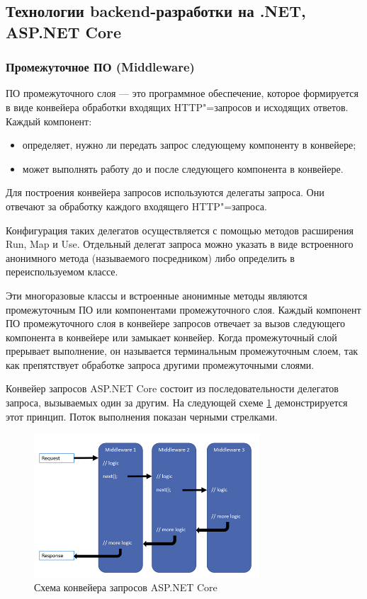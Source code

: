 \subsection{Технологии backend-разработки на .NET, ASP.NET Core}

\subsubsection{Промежуточное ПО (Middleware)}
ПО промежуточного слоя --- это программное обеспечение, которое формируется в виде конвейера обработки входящих HTTP"=запросов и исходящих ответов. Каждый компонент:

\begin{itemize}
	\item{определяет, нужно ли передать запрос следующему компоненту в конвейере;}
	\item{может выполнять работу до и после следующего компонента в конвейере.}
\end{itemize}


Для построения конвейера запросов используются делегаты запроса. Они отвечают за обработку каждого входящего HTTP"=запроса.

Конфигурация таких делегатов осуществляется с помощью методов расширения Run, Map и Use. Отдельный делегат запроса можно указать в виде встроенного анонимного метода (называемого посредником) либо определить в переиспользуемом классе.

Эти многоразовые классы и встроенные анонимные методы являются промежуточным ПО или компонентами промежуточного слоя. Каждый компонент ПО промежуточного слоя в конвейере запросов отвечает за вызов следующего компонента в конвейере или замыкает конвейер. Когда промежуточный слой прерывает выполнение, он называется терминальным промежуточным слоем, так как препятствует обработке запроса другими промежуточными слоями.

Конвейер запросов ASP.NET Core состоит из последовательности делегатов запроса, вызываемых один за другим. На следующей схеме \ref{fig:Middleware} демонстрируется этот принцип. Поток выполнения показан черными стрелками.

\begin{figure}[!h]
    \centering
    \includegraphics[width = 0.75\textwidth]{imgs/middleware.png}
    \caption{Схема конвейера запросов ASP.NET Core}
    \label{fig:Middleware}
\end{figure}

